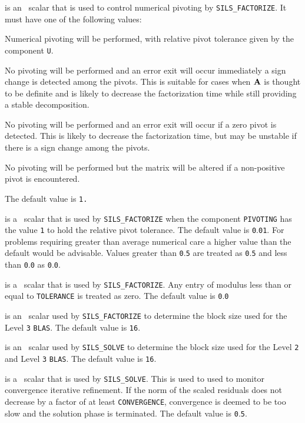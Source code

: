 \documentclass{galahad}
\newcommand{\packagename}{SILS}
\begin{document}
\begin{description}
 is an \integer\ scalar that is used to control numerical 
pivoting by {\tt \packagename\_FACTORIZE}. It must have one of the 
following values: 

\begin{description} 
  Numerical pivoting will be performed, with relative pivot  
tolerance given by the component {\tt U}.  
 
  No pivoting will be performed and an error exit will occur 
immediately a sign change is detected among the pivots. This is 
suitable for cases when ${\mathbf{A}}$  is thought to be definite and is likely to 
decrease the factorization time while still providing a stable 
decomposition. 
 
  No pivoting will be performed and an error exit will occur if a 
zero pivot is detected. This is likely to decrease the factorization 
time, but may be unstable if there is a sign change among the pivots. 
 
  No pivoting will be performed but the matrix will be altered 
if a non-positive pivot is encountered. 

\end{description} 

\noindent The default value is {\tt 1.} 
 
 is a \realdp\ scalar that is used by {\tt \packagename\_FACTORIZE} 
when the 
component {\tt PIVOTING} has the value {\tt 1} to hold the relative pivot 
tolerance.  The default value is {\tt 0}.{\tt 01}.  For problems requiring 
greater 
than average numerical care a higher value than the default would be 
advisable. Values greater than {\tt 0}.{\tt 5} are treated as {\tt 0}.{\tt 5} 
and less than {\tt 0}.{\tt 0} as {\tt 0}.{\tt 0}. 
 
 is a \realdp\ scalar that is used by 
{\tt \packagename\_FACTORIZE}.  
Any entry of modulus less than or equal to {\tt TOLERANCE} is treated as zero. 
The default value is {\tt 0}.{\tt 0}
 
 is an \integer\ scalar used by 
{\tt \packagename\_FACTORIZE} 
to determine 
the block size used for the Level {\tt 3} {\tt BLAS}.  The default value 
is {\tt 16}. 
 
 is an \integer\ scalar used by {\tt \packagename\_SOLVE} 
to determine the block size used for the Level {\tt 2} and Level {\tt 3} 
{\tt BLAS}.  The default value is {\tt 16}. 
 
 is a \realdp\ scalar that is used by 
{\tt \packagename\_SOLVE}.  This is used to used to monitor convergence 
iterative refinement. If the norm of
the scaled residuals does not decrease by a factor of at least
{\tt CONVERGENCE}, convergence is deemed to be too slow and the
solution phase is terminated.
The default value is {\tt 0}.{\tt 5}. 


\end{description}
\end{document}
